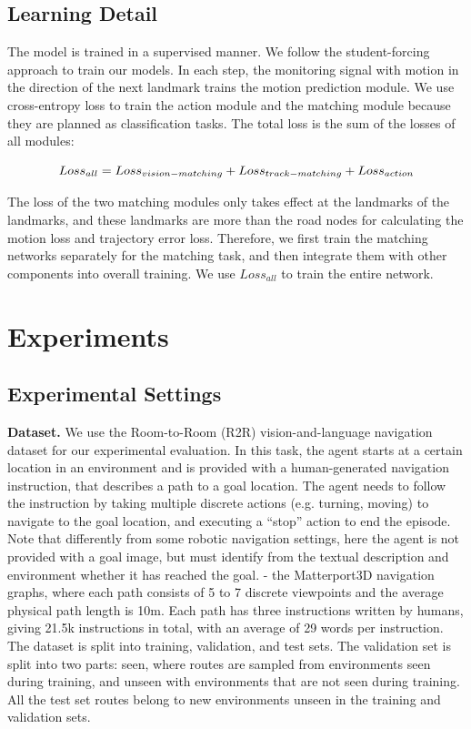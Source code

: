 \subsection{Learning Detail}
	
The model is trained in a supervised manner. We follow the student-forcing approach to train our models. In each step, the monitoring signal with motion in the direction of the next landmark trains the motion prediction module. We use cross-entropy loss to train the action module and the matching module because they are planned as classification tasks. The total loss is the sum of the losses of all modules:
	
\begin{equation}
	\centering
	{Loss}_{all} = {Loss}_{vision-matching} + {Loss}_{track-matching} + {Loss}_{action}
\end{equation}

The loss of the two matching modules only takes effect at the landmarks of the landmarks, and these landmarks are more than the road nodes for calculating the motion loss and trajectory error loss. Therefore, we first train the matching networks separately for the matching task, and then integrate them with other components into overall training. We use ${Loss}_{all}$ to train the entire network.

\section{Experiments}
	
\subsection{Experimental Settings}
	
\textbf{Dataset.} We use the Room-to-Room (R2R) vision-and-language navigation dataset for our experimental evaluation\cite{anderson2018vision}. In this task, the agent starts at a certain location in an environment and is provided with a human-generated navigation instruction, that describes a path to a goal location. The agent needs to follow the instruction by taking multiple discrete actions (e.g. turning, moving) to navigate to the goal location, and executing a “stop” action to end the episode. Note that differently from some robotic navigation settings, here the agent is not provided with a goal image, but must identify from the textual description and environment whether it has reached the goal.
	- the Matterport3D navigation graphs, where each path consists of 5 to 7 discrete viewpoints and the average physical path length is 10m. Each path has three instructions written by humans, giving 21.5k instructions in total, with an average of 29 words per instruction. The dataset is split into training, validation, and test sets. The validation set is split into two parts: seen, where routes are sampled from environments seen during training, and unseen with environments that are not seen during training. All the test set routes belong to new environments unseen in the training and validation sets.

